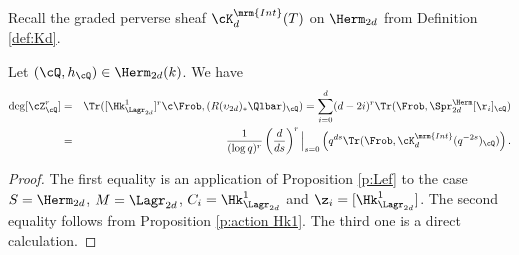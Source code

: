 Recall the graded perverse sheaf $\cK^{\mrm{Int}}_{d}(T)$ on $\Herm_{2d}$ from Definition \ref{def:Kd}.

\begin{cor}
\notready\label{cor: trace of correspondence} Let $(\cQ,h_{\cQ})\in \Herm_{2d}(k)$. We have
\begin{eqnarray*}
\deg[\cZ^{r}_{\cQ}]&=&\Tr( [\Hk^{1}_{\Lagr_{2d}}]^r\c\Frob, (R(\upsilon_{2d})_{*}\Qlbar)_{\cQ}) = \sum_{i=0}^d (d-2i)^r \Tr(\Frob, \Spr^{\Herm}_{2d}[\r_{i}]_{\cQ})  \\
&=& \frac{1}{(\log q)^r} \left(\frac{d}{ds}\right)^r\Big|_{s=0} \left(q^{ds}\Tr(\Frob, \cK_d^{\mrm{Int}}(q^{-2s})_{\cQ})\right).
\end{eqnarray*}
\end{cor}
%
\begin{proof}
The first equality is an application of Proposition \ref{p:Lef} to the case $S=\Herm_{2d}$, $M=\Lagr_{2d}$, $C_{i}=\Hk^{1}_{\Lagr_{2d}}$ and $\z_{i}=[\Hk^{1}_{\Lagr_{2d}}]$.  The second equality follows from Proposition \ref{p:action Hk1}. The third one is a direct calculation.
\end{proof}

